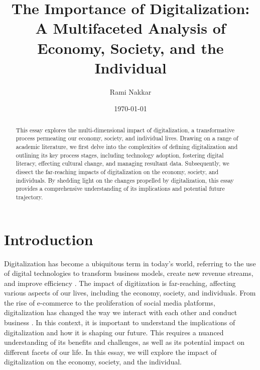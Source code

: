 \documentclass[12pt]{article}
\begin{document}
\onehalfspacing

\title{The Importance of Digitalization: A Multifaceted Analysis of Economy, Society, and the Individual}
\author{Rami Nakkar}
\date{\today}
\maketitle

\begin{abstract}
This essay explores the multi-dimensional impact of digitalization, a transformative process permeating our economy, society, and individual lives. Drawing on a range of academic literature, we first delve into the complexities of defining digitalization and outlining its key process stages, including technology adoption, fostering digital literacy, effecting cultural change, and managing resultant data. Subsequently, we dissect the far-reaching impacts of digitalization on the economy, society, and individuals. By shedding light on the changes propelled by digitalization, this essay provides a comprehensive understanding of its implications and potential future trajectory.
\end{abstract}

\newpage

\section{Introduction}
Digitalization has become a ubiquitous term in today's world, referring to the use of digital technologies to transform business models, create new revenue streams, and improve efficiency \cite{Gartner.5312023}. The impact of digitization is far-reaching, affecting various aspects of our lives, including the economy, society, and individuals. From the rise of e-commerce to the proliferation of social media platforms, digitalization has changed the way we interact with each other and conduct business \cite{WillemvanWinden.2017}. In this context, it is important to understand the implications of digitalization and how it is shaping our future. This requires a nuanced understanding of its benefits and challenges, as well as its potential impact on different  facets of our life. In this essay, we will explore the impact of digitalization on the economy, society, and the individual.
\end{document}
